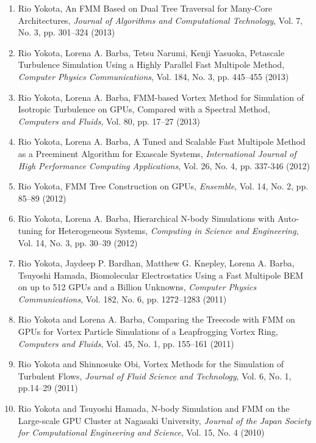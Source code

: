 \documentclass[margin,line]{cv}
\begin{document}
\begin{resume}
\begin{enumerate}
\item Rio Yokota, An FMM Based on Dual Tree Traversal for Many-Core Architectures,  {\it Journal of Algorithms and Computational Technology}, Vol. 7, No. 3, pp. 301--324 (2013)

\item Rio Yokota, Lorena A. Barba, Tetsu Narumi, Kenji Yasuoka, Petascale Turbulence Simulation Using a Highly Parallel Fast Multipole Method, {\it Computer Physics Communications}, Vol. 184, No. 3, pp. 445--455 (2013)

\item Rio Yokota, Lorena A. Barba, FMM-based Vortex Method for Simulation of Isotropic Turbulence on GPUs, Compared with a Spectral Method, {\it Computers and Fluids}, Vol. 80, pp. 17--27 (2013)

\item Rio Yokota, Lorena A. Barba, A Tuned and Scalable Fast Multipole Method as a Preeminent Algorithm for Exascale Systems, {\it International Journal of High Performance Computing Applications}, Vol. 26, No. 4, pp. 337-346 (2012)

\item Rio Yokota, FMM Tree Construction on GPUs,  {\it Ensemble}, Vol. 14, No. 2, pp. 85--89 (2012)

\item Rio Yokota, Lorena A. Barba, Hierarchical N-body Simulations with Auto-tuning for Heterogeneous Systems,  {\it Computing in Science and Engineering}, Vol. 14, No. 3, pp. 30--39 (2012)

\item Rio Yokota, Jaydeep P. Bardhan, Matthew G. Knepley, Lorena A. Barba, Tsuyoshi Hamada, Biomolecular Electrostatics Using a Fast Multipole BEM on up to 512 GPUs and a Billion Unknowns, {\it Computer Physics Communications}, Vol. 182, No. 6, pp. 1272--1283 (2011)

\item Rio Yokota and Lorena A. Barba, Comparing the Treecode with FMM on GPUs for Vortex Particle Simulations of a Leapfrogging Vortex Ring, {\it Computers and Fluids}, Vol. 45, No. 1, pp. 155--161 (2011)

\item Rio Yokota and Shinnosuke Obi, Vortex Methods for the Simulation of Turbulent Flows, {\it Journal of Fluid Science and Technology}, Vol. 6, No. 1, pp.14--29 (2011)

\item Rio Yokota and Tsuyoshi Hamada, N-body Simulation and FMM on the Large-scale GPU Cluster at Nagasaki University, {\it Journal of the Japan Society for Computational Engineering and Science}, Vol. 15, No. 4 (2010)


\end{enumerate}
\end{resume}
\end{document}
